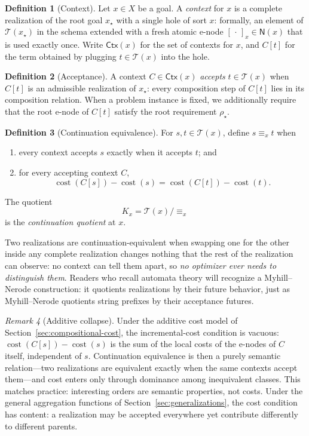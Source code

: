 \documentclass[sigconf,nonacm]{acmart}
\theoremstyle{definition}
\newtheorem{definition}{Definition}[section]
\theoremstyle{plain}
\theoremstyle{remark}
\newtheorem{remark}[definition]{Remark}
\begin{document}
\begin{definition}[Context]
Let $x\in X$ be a goal.  A \emph{context} for $x$ is a complete
realization of the root goal $x_\star$ with a single hole of sort
$x$: formally, an element of $\mathcal T(x_\star)$ in the schema
extended with a fresh atomic e-node
$[\,\cdot\,]_x\in\mathsf N(x)$ that is used exactly once.
Write $\mathsf{Ctx}(x)$ for the set of contexts for $x$, and $C[t]$
for the term obtained by plugging $t\in\mathcal T(x)$ into the hole.
\end{definition}

\begin{definition}[Acceptance]
A context $C\in\mathsf{Ctx}(x)$ \emph{accepts} $t\in\mathcal T(x)$
when $C[t]$ is an admissible realization of $x_\star$: every
composition step of $C[t]$ lies in its composition relation.
When a problem instance is fixed, we additionally require that the
root e-node of $C[t]$ satisfy the root requirement $\rho_\star$.
\end{definition}

\begin{definition}[Continuation equivalence]
\label{def:continuation}
For $s,t\in\mathcal T(x)$, define $s\equiv_x t$ when

\begin{enumerate}
\item every context accepts $s$ exactly when it accepts $t$; and
\item for every accepting context $C$,
\[
\operatorname{cost}(C[s])-\operatorname{cost}(s)
=
\operatorname{cost}(C[t])-\operatorname{cost}(t).
\]
\end{enumerate}

The quotient
\[
K_x=\mathcal T(x)/{\equiv_x}
\]
is the \emph{continuation quotient} at $x$.
\end{definition}

Two realizations are continuation-equivalent when swapping one for
the other inside any complete realization changes nothing that the
rest of the realization can observe: no context can tell them apart,
so \emph{no optimizer ever needs to distinguish them}.  Readers who
recall automata theory will recognize a Myhill--Nerode construction:
it quotients realizations by their future behavior, just as
Myhill--Nerode quotients string prefixes by their acceptance
futures.

\begin{remark}[Additive collapse]
Under the additive cost model of
Section~\ref{sec:compositional-cost}, the incremental-cost condition
is vacuous: $\operatorname{cost}(C[s])-\operatorname{cost}(s)$ is
the sum of the local costs of the e-nodes of $C$ itself, independent
of $s$.  Continuation equivalence is then a purely semantic
relation---two realizations are equivalent exactly when the same
contexts accept them---and cost enters only through dominance among
inequivalent classes.  This matches practice: interesting orders are
semantic properties, not costs.  Under the general aggregation
functions of Section~\ref{sec:generalizations}, the cost condition
has content: a realization may be accepted everywhere yet contribute
differently to different parents.
\end{remark}
\end{document}
